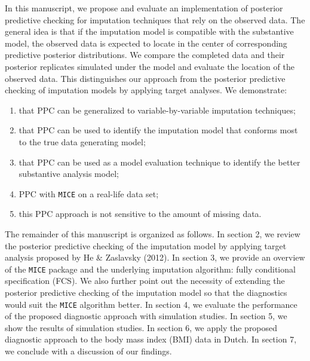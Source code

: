 \documentclass[12pt, fullpage, a4paper]{article}
\begin{document}
In this manuscript, we propose and evaluate an implementation of posterior predictive checking for imputation techniques that rely on the observed data. The general idea is that if the imputation model is compatible with the substantive model, the observed data is expected to locate in the center of corresponding predictive posterior distributions. We compare the completed data and their posterior replicates simulated under the model and evaluate the location of the observed data. This distinguishes our approach from the posterior predictive checking of imputation models by applying target analyses. We demonstrate:
\begin{enumerate}
	\item that PPC can be generalized to variable-by-variable imputation techniques; 
	\item that PPC can be used to identify the imputation model that conforms most to the true data generating model;
	\item that PPC can be used as a model evaluation technique to identify the better substantive analysis model;
	\item PPC with \texttt{MICE} on a real-life data set;
	\item this PPC approach is not sensitive to the amount of missing data.
\end{enumerate}
The remainder of this manuscript is organized as follows. In section 2, we review the posterior predictive checking of the imputation model by applying target analysis proposed by He \& Zaslavsky (2012). In section 3, we provide an overview of the \texttt{MICE} package and the underlying imputation algorithm: fully conditional specification (FCS). We also further point out the necessity of extending the posterior predictive checking of the imputation model so that the diagnostics would suit the \texttt{MICE} algorithm better. In section 4, we evaluate the performance of the proposed diagnostic approach with simulation studies. In section 5, we show the results of simulation studies. In section 6, we apply the proposed diagnostic approach to the body mass index (BMI) data in Dutch. In section 7, we conclude with a discussion of our findings.  
\end{document}

